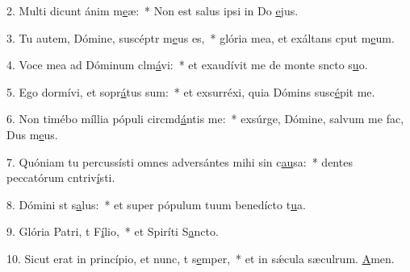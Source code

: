2. Multi dicunt ánim m\uline{e}æ:~* Non est salus ipsi in Do \uline{e}jus.\par 
3. Tu autem, Dómine, suscéptr m\uline{e}us es,~* glória mea, et exáltans cput m\uline{e}um.\par 
4. Voce mea ad Dóminum clm\uline{á}vi:~* et exaudívit me de monte sncto s\uline{u}o.\par 
5. Ego dormívi, et sopr\uline{á}tus sum:~* et exsurréxi, quia Dómins susc\uline{é}pit me.\par 
6. Non timébo míllia pópuli circmd\uline{á}ntis me:~* exsúrge, Dómine, salvum me fac, Dus m\uline{e}us.\par 
7. Quóniam tu percussísti omnes adversántes mihi sin c\uline{au}sa:~* dentes peccatórum cntriv\uline{í}sti.\par 
8. Dómini st s\uline{a}lus:~* et super pópulum tuum benedícto t\uline{u}a.\par 
9. Glória Patri, t F\uline{í}lio,~* et Spiríti S\uline{a}ncto.\par 
10. Sicut erat in princípio, et nunc, t s\uline{e}mper,~* et in sǽcula sæculrum. \uline{A}men.\par 
